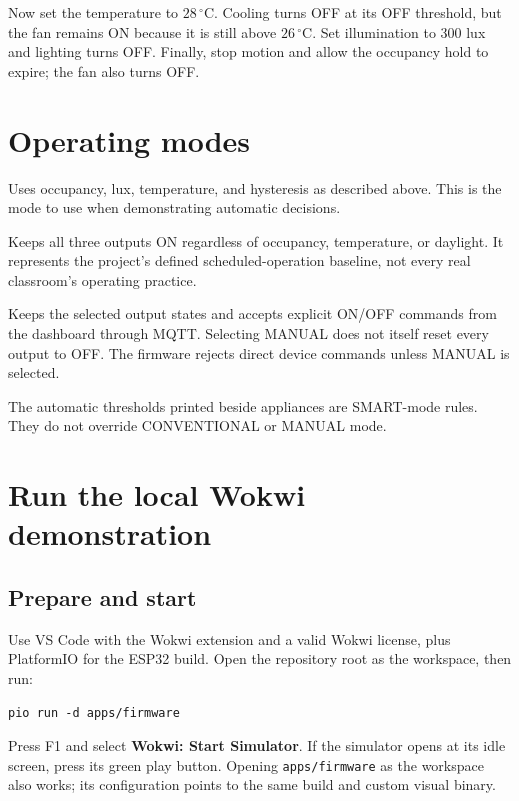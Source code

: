 \documentclass[11pt,a4paper]{article}
\newcommand{\temp}[1]{\ensuremath{#1\,^{\circ}\mathrm{C}}}
\newcommand{\file}[1]{\nolinkurl{#1}}
\begin{document}
Now set the temperature to \temp{28}. Cooling turns OFF at its OFF
threshold, but the fan remains ON because it is still above \temp{26}.
Set illumination to 300 lux and lighting turns OFF. Finally, stop
motion and allow the occupancy hold to expire; the fan also turns OFF.

\section{Operating modes}
\begin{description}[style=nextline]
  \item[SMART --- the default]
  Uses occupancy, lux, temperature, and hysteresis as described above.
  This is the mode to use when demonstrating automatic decisions.
  \item[CONVENTIONAL --- the comparison baseline]
  Keeps all three outputs ON regardless of occupancy, temperature, or
  daylight. It represents the project's defined scheduled-operation
  baseline, not every real classroom's operating practice.
  \item[MANUAL --- direct demonstration control]
  Keeps the selected output states and accepts explicit ON/OFF commands
  from the dashboard through MQTT. Selecting MANUAL does not itself
  reset every output to OFF. The firmware rejects direct device commands
  unless MANUAL is selected.
\end{description}

The automatic thresholds printed beside appliances are SMART-mode
rules. They do not override CONVENTIONAL or MANUAL mode.

\section{Run the local Wokwi demonstration}
\label{sec:run}
\subsection{Prepare and start}
Use VS Code with the Wokwi extension and a valid Wokwi license, plus
PlatformIO for the ESP32 build. Open the repository root as the
workspace, then run:
\begin{lstlisting}
pio run -d apps/firmware
\end{lstlisting}
Press F1 and select \textbf{Wokwi: Start Simulator}. If the simulator
opens at its idle screen, press its green play button. Opening
\file{apps/firmware} as the workspace also works; its configuration
points to the same build and custom visual binary.
\end{document}

